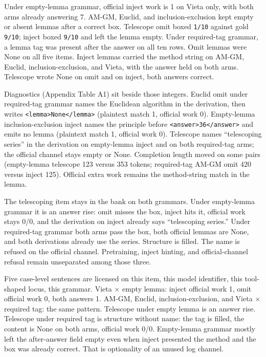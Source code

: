 \documentclass[11pt,letterpaper]{article}
\begin{document}
Under empty-lemma grammar, official inject work is 1 on Vieta only, with both arms already answering 7. AM-GM, Euclid, and inclusion-exclusion kept empty or absent lemmas after a correct box. Telescope omit boxed \texttt{1/\allowbreak{}10} against gold \texttt{9/\allowbreak{}10}; inject boxed \texttt{9/\allowbreak{}10} and left the lemma empty. Under required-tag grammar, a lemma tag was present after the answer on all ten rows. Omit lemmas were None on all five items. Inject lemmas carried the method string on AM-GM, Euclid, inclusion-exclusion, and Vieta, with the answer held on both arms. Telescope wrote None on omit and on inject, both answers correct.

Diagnostics (Appendix Table A1) sit beside those integers. Euclid omit under required-tag grammar names the Euclidean algorithm in the derivation, then writes \texttt{<lemma>\allowbreak{}None</\allowbreak{}lemma>\allowbreak{}} (plaintext match 1, official work 0). Empty-lemma inclusion-exclusion inject names the principle before \texttt{<answer>\allowbreak{}36</\allowbreak{}answer>\allowbreak{}} and emits no lemma (plaintext match 1, official work 0). Telescope names “telescoping series” in the derivation on empty-lemma inject and on both required-tag arms; the official channel stays empty or None. Completion length moved on some pairs (empty-lemma telescope 123 versus 353 tokens; required-tag AM-GM omit 420 versus inject 125). Official extra work remains the method-string match in the lemma.

The telescoping item stays in the bank on both grammars. Under empty-lemma grammar it is an answer rise: omit misses the box, inject hits it, official work stays 0/0, and the derivation on inject already says “telescoping series.” Under required-tag grammar both arms pass the box, both official lemmas are None, and both derivations already use the series. Structure is filled. The name is refused on the official channel. Pretraining, inject hinting, and official-channel refusal remain unseparated among those three.

Five case-level sentences are licensed on this item, this model identifier, this tool-shaped locus, this grammar. Vieta × empty lemma: inject official work 1, omit official work 0, both answers 1. AM-GM, Euclid, inclusion-exclusion, and Vieta × required tag: the same pattern. Telescope under empty lemma is an answer rise. Telescope under required tag is structure without name: the tag is filled, the content is None on both arms, official work 0/0. Empty-lemma grammar mostly left the after-answer field empty even when inject presented the method and the box was already correct. That is optionality of an unused log channel.
\end{document}
